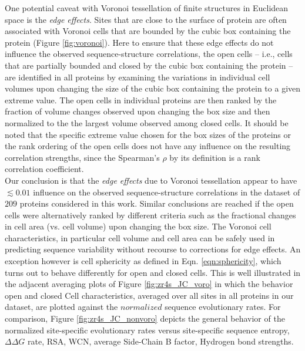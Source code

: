 \documentclass[11pt]{article}
\begin{document}
    One potential caveat with Voronoi tessellation of finite structures in Euclidean space is the {\it edge effects}. Sites that are close to the surface of protein are often associated with Voronoi cells that are bounded by the cubic box containing the protein (Figure \ref{fig:voronoi}). Here to ensure that these edge effects do not influence the observed sequence-structure correlations, the open cells -- i.e., cells that are partially bounded and closed by the cubic box containing the protein -- are identified in all proteins by examining the variations in individual cell volumes upon changing the size of the cubic box containing the protein to a given extreme value. The open cells in individual proteins are then ranked by the fraction of volume changes observed upon changing the box size and then normalized to the the largest volume observed among closed cells. It should be noted that the specific extreme value chosen for the box sizes of the proteins or the rank ordering of the open cells does not have any influence on the resulting correlation strengths, since the Spearman's $\rho$ by its definition is a rank correlation coefficient. \\

    Our conclusion is that the {\it edge effects} due to Voronoi tessellation appear to have $\lesssim0.01$ influence on the observed sequence-structure correlations in the dataset of $209$ proteins considered in this work. Similar conclusions are reached if the open cells were alternatively ranked by different criteria such as the fractional changes in cell area (vs. cell volume) upon changing the box size. The Voronoi cell characteristics, in particular cell volume and cell area can be safely used in predicting sequence variability without recourse to corrections for edge effects. An exception however is cell sphericity as defined in Eqn. \ref{eqn:sphericity}, which turns out to behave differently for open and closed cells. This is well illustrated in the adjacent averaging plots of Figure \ref{fig:zr4s_JC_voro} in which the behavior open and closed Cell characteristics, averaged over all sites in all proteins in our dataset, are plotted against the $normalized$ sequence evolutionary rates. For comparison, Figure \ref{fig:zr4s_JC_nonvoro} depicts the general behavior of the normalized site-specific evolutionary rates versus site-specific sequence entropy, $\Delta\Delta G$ rate, RSA, WCN, average Side-Chain B factor, Hydrogen bond strengths. \\

\end{document}
